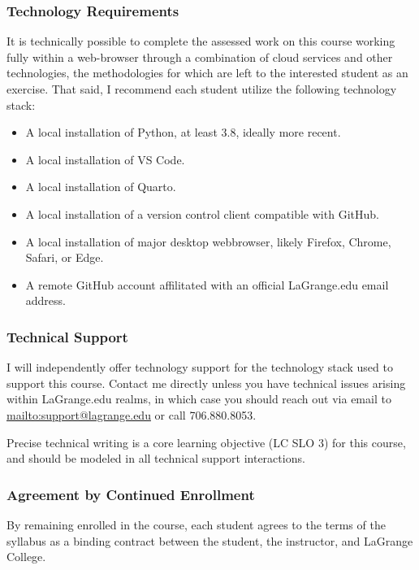 \documentclass[11pt]{article}
\begin{document}
\subsubsection*{Technology Requirements}

It is technically possible to complete the assessed work on this course working fully within a web-browser through a combination of cloud services and other technologies, the methodologies for which are left to the interested student as an exercise. That said, I recommend each student utilize the following technology stack:

\begin{itemize}
\item A local installation of Python, at least 3.8, ideally more recent.
\item A local installation of VS Code.
\item A local installation of Quarto.
\item A local installation of a version control client compatible with GitHub.
\item A local installation of major desktop webbrowser, likely Firefox, Chrome, Safari, or Edge.
\item A remote GitHub account affilitated with an official LaGrange.edu email address.
\end{itemize}

\subsubsection*{Technical Support}

I will independently offer technology support for the technology stack used to support this course. Contact me directly unless you have technical issues arising within LaGrange.edu realms, in which case you should reach out via email to \href{support@lagrange.edu}{mailto:support@lagrange.edu} or call 706.880.8053.

Precise technical writing is a core learning objective (LC SLO 3) for this course, and should be modeled in all technical support interactions.

\subsubsection*{Agreement by Continued Enrollment}

By remaining enrolled in the course, each student agrees to the terms of the syllabus as a binding contract between the student, the instructor, and LaGrange College.
\end{document}
